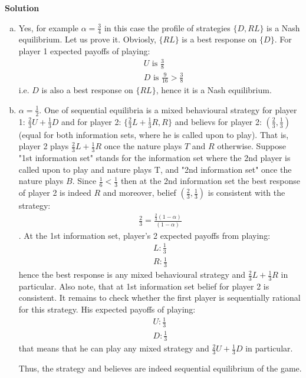 \documentclass[a4paper]{article}
\begin{document}
\textbf{Solution}
\begin{enumerate}[(a)]
	\item Yes, for example $\alpha = \frac{3}{4}$ in this case the profile of strategies $\{D, RL\}$ is a Nash equilibrium. Let us prove it. Obviosly, $\{RL\}$ is a best response on $\{D\}$. For player 1 expected payoffs of playing:
	\begin{align*}
	&U\text{ is } \frac{3}{8}\\
	&D\text{ is } \frac{9}{16} > \frac{3}{8}
	\end{align*}
	i.e. $D$ is also a best response on $\{RL\}$, hence it is a Nash equilibrium.
	\item $\alpha = \frac{1}{2}$. One of sequential equilibria is a mixed behavioural strategy for player 1: $\frac{2}{3}U + \frac{1}{3}D$ and for player 2: $\{\frac{2}{3}L + \frac{1}{3}R, R\}$ and believs for player 2: $(\frac{2}{3}, \frac{1}{3})$ (equal for both information sets, where he is called upon to play). That is, player 2 plays $\frac{2}{3}L + \frac{1}{3}R$ once the nature plays $T$ and $R$ otherwise. Suppose "1st information set" stands for the information set where the 2nd player is called upon to play and nature plays T, and "2nd information set" once the nature plays $B$. Since $\frac{1}{6} < \frac{1}{3}$ then at the 2nd information set the best response of player 2 is indeed $R$ and moreover, belief $(\frac{2}{3}, \frac{1}{3})$ is consistent with the strategy:
	\begin{align*}
	\frac{2}{3} = \frac{\frac{2}{3}(1-\alpha)}{(1 - \alpha)}
	\end{align*}. At the 1st information set, player's 2 expected payoffs from playing:
	\begin{align*}
	L: \frac{1}{3}\\
	R: \frac{1}{3}
	\end{align*}
	hence the best response is any mixed behavioural strategy and $\frac{2}{3}L + \frac{1}{3}R$ in particular. Also note, that at 1st information set belief for player 2 is consistent. It remains to check whether the first player is sequentially rational for this strategy. His expected payoffs of playing:
	\begin{align*}
	U: \frac{1}{3}\\
	D: \frac{1}{3}
	\end{align*}
	that means that he can play any mixed strategy and $\frac{2}{3}U + \frac{1}{3}D$ in particular.
	
	Thus, the strategy and believes are indeed sequential equilibrium of the game.
\end{enumerate}
\end{document}
